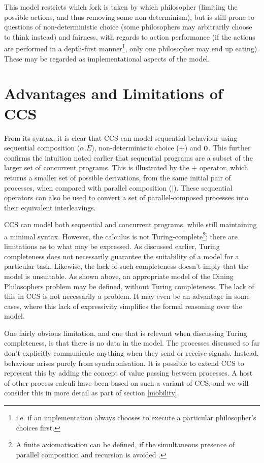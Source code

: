 This model restricts which fork is taken by which philosopher
(limiting the possible actions, and thus removing some
non-determinism), but is still prone to questions of non-deterministic
choice (some philosophers may arbitrarily choose to think instead) and
fairness, with regards to action performance (if the actions are
performed in a depth-first manner\footnote{i.e. if an implementation
  always chooses to execute a particular philosopher's choices
  first.}, only one philosopher may end up eating).  These may be
regarded as implementational aspects of the model.

\section{Advantages and Limitations of CCS}
\label{ccslimit}

From its syntax, it is clear that CCS can model sequential behaviour
using sequential composition ($\alpha.E$), non-deterministic choice
($+$) and $\textbf{0}$.  This further confirms the intuition noted earlier that
sequential programs are a subset of the larger set of concurrent
programs.  This is illustrated by the $+$ operator, which
returns a smaller set of possible derivations, from the same initial
pair of processes, when compared with parallel composition ($|$).
These sequential operators can also be used to convert a set of
parallel-composed processes into their equivalent interleavings.

CCS can model both sequential and concurrent programs, while still
maintaining a minimal syntax.  However, the calculus is not
Turing-complete\footnote{A finite axiomatisation can be defined, if
  the simultaneous presence of parallel composition and recursion is
  avoided \cite{milner:ccsaxiom}.}; there are limitations as to what
may be expressed.  As discussed earlier, Turing completeness does not
necessarily guarantee the suitability of a model for a particular
task. Likewise, the lack of such completeness doesn't imply that the
model is unsuitable.  As shown above, an appropriate model of the
Dining Philosophers problem may be defined, without Turing
completeness.  The lack of this in CCS is not necessarily a problem.
It may even be an advantage in some cases, where this lack of
expressivity simplifies the formal reasoning over the model.

One fairly obvious limitation, and one that is relevant when
discussing Turing completeness, is that there is no data in the model.
The processes discussed so far don't explicitly communicate anything
when they send or receive signals.  Instead, behaviour arises purely
from synchronisation.  It is possible to extend CCS to represent this
by adding the concept of value passing between processes.  A host of
other process calculi have been based on such a variant of CCS, and we
will consider this in more detail as part of section \ref{mobility}.

